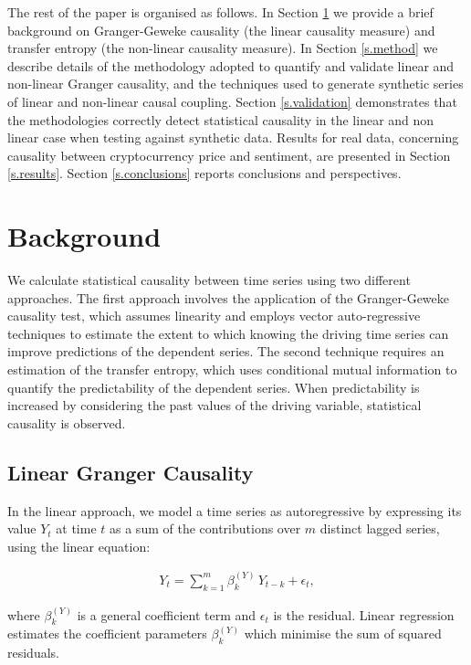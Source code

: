 \documentclass[]{rsos}%
\begin{document}
{ The rest of the paper is organised as follows. In Section \ref{s.background} we provide a brief background on Granger-Geweke causality (the linear causality measure) and transfer entropy (the non-linear causality measure). In Section \ref{s.method} we describe details of the methodology adopted to quantify and validate linear and non-linear Granger causality, and the techniques used to generate synthetic series of linear and non-linear causal coupling. Section \ref{s.validation} demonstrates that the methodologies correctly detect statistical causality in the linear and non linear case when testing against synthetic data. Results for real data, concerning causality between cryptocurrency price and sentiment, are presented in Section \ref{s.results}. Section \ref{s.conclusions} reports conclusions and perspectives.


\section{Background} \label{s.background}  

  We calculate statistical causality between time series using two different approaches. The first approach involves the application of the Granger-Geweke causality test, which assumes linearity and employs vector auto-regressive techniques to estimate the extent to which knowing the driving time series can improve predictions of the dependent series. The second technique requires an estimation of the transfer entropy, which uses conditional mutual information to quantify the predictability of the dependent series. When predictability is increased by considering the past values of the driving variable, statistical causality is observed.
  
  \subsection{Linear Granger Causality}
  
  In the linear approach, we model a time series as autoregressive by expressing its value $Y_t$ at time $t$ as a sum of the contributions over $m$ distinct lagged series, using the linear equation:

  \begin{eqnarray}
    \label{eq:autoregression1}
    Y_t = \sum_{k=1}^m \beta_{k}^{(Y)} \, Y_{t-k} + \epsilon_t ,
  \end{eqnarray}

  where $\beta^{(Y)}_k$ is a general coefficient term and $\epsilon_t$ is the residual. Linear regression estimates the coefficient parameters $\beta^{(Y)}_k$ which minimise the sum of squared residuals. 

}
\end{document}
